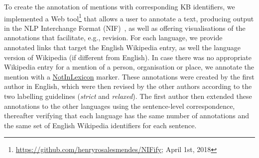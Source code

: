 \documentclass{llncs}
\begin{document}

To create the annotation of mentions with corresponding KB identifiers, we implemented a Web tool\footnote{\url{https://github.com/henryrosalesmendes/NIFify}; April 1st, 2018} that allows a user to annotate a text, producing output in the NLP Interchange Format (NIF)~\cite{HellmannLAB13}, as well as offering visualisations of the annotations that facilitate, e.g., revision. For each language, we provide annotated links that target the English Wikipedia entry, as well the language version of Wikipedia (if different from English). In case there was no appropriate Wikipedia entry for a mention of a person, organisation or place, we annotate the mention with a \url{NotInLexicon} marker. These annotations were created by the first author in English, which were then revised by the other authors according to the two labelling guidelines (\textit{strict} and \textit{relaxed}). The first author then extended these annotations to the other languages using the sentence-level correspondence, thereafter verifying that each language has the same number of annotations and the same set of English Wikipedia identifiers for each sentence.
\end{document}
